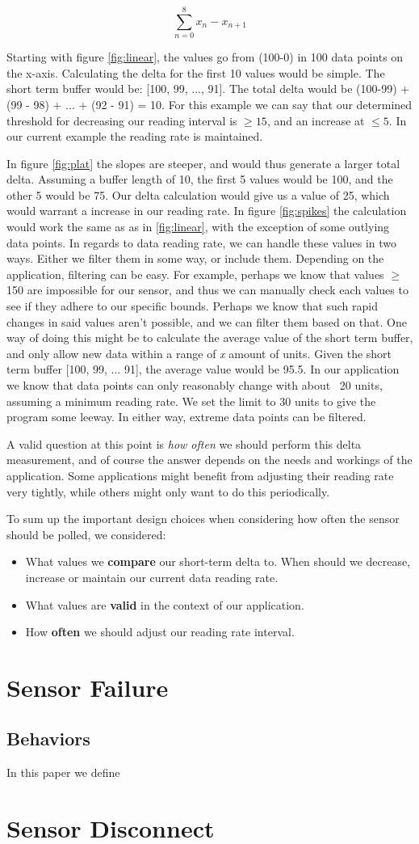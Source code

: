 $$\sum_{n=0}^{8} x_n - x_{n+1}$$

Starting with figure \ref{fig:linear}, the values go from (100-0) in 100 data points on the x-axis. Calculating the delta for the first 10 values would be simple. The short term buffer would be: [100, 99, ..., 91]. The total delta would be (100-99) + (99 - 98) + ... + (92 - 91) = 10. For this example we can say that our determined threshold for decreasing our reading interval is $\geq 15$, and an increase at $\leq 5$. In our current example the reading rate is maintained. 

In figure \ref{fig:plat} the slopes are steeper, and would thus generate a larger total delta. Assuming a buffer length of 10, the first 5 values would be 100, and the other 5 would be 75. Our delta calculation would give us a value of 25, which would warrant a increase in our reading rate. In figure \ref{fig:spikes} the calculation would work the same as as in \ref{fig:linear}, with the exception of some outlying data points. In regards to data reading rate, we can handle these values in two ways. Either we filter them in some way, or include them. Depending on the application, filtering can be easy. For example, perhaps we know that values $\geq$ 150 are impossible for our sensor, and thus we can manually check each values to see if they adhere to our specific bounds. Perhaps we know that such rapid changes in said values aren't possible, and we can filter them based on that. One way of doing this might be to calculate the average value of the short term buffer, and only allow new data within a range of  \textit{x} amount of units. Given the short term buffer [100, 99, ... 91], the average value would be 95.5. In our application we know that data points can only reasonably change with about ~20 units, assuming a minimum reading rate. We set the limit to 30 units to give the program some leeway. In either way, extreme data points can be filtered. 

A valid question at this point is \textit{how often} we should perform this delta measurement, and of course the answer depends on the needs and workings of the application. Some applications might benefit from adjusting their reading rate very tightly, while others might only want to do this periodically. 

To sum up the important design choices when considering how often the sensor should be polled, we considered:
\begin{itemize}
	\item What values we \textbf{compare} our short-term delta to. When should we decrease, increase or maintain our current data reading rate.
	\item What values are \textbf{valid} in the context of our application.
	\item How \textbf{often} we should adjust our reading rate interval.
\end{itemize}

\section{Sensor Failure}

\subsection{Behaviors}
In this paper we define

\section{Sensor Disconnect}